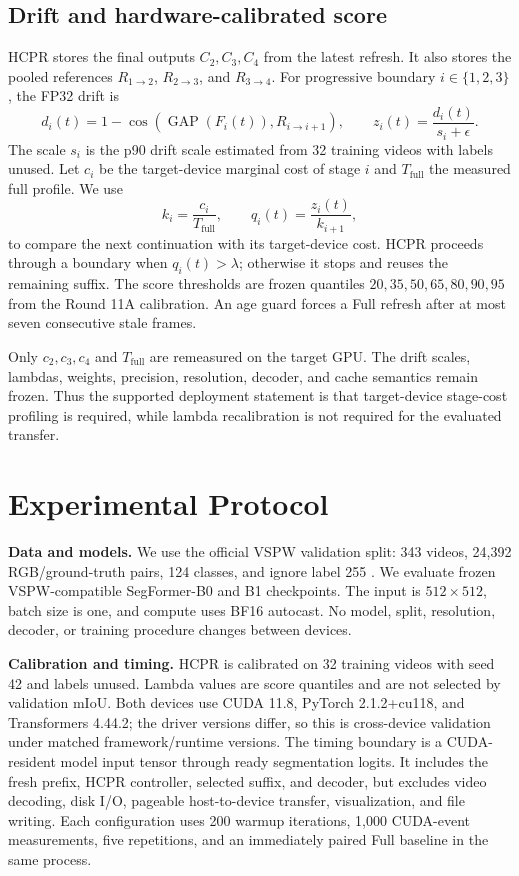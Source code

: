 \documentclass{article}
\begin{document}
\subsection{Drift and hardware-calibrated score}
HCPR stores the final outputs $C_2,C_3,C_4$ from the latest refresh. It also stores the pooled references $R_{1\to2}$, $R_{2\to3}$, and $R_{3\to4}$. For progressive boundary $i\in\{1,2,3\}$, the FP32 drift is
\begin{equation}
 d_i(t)=1-\cos\!\left(\operatorname{GAP}(F_i(t)),R_{i\to i+1}\right),\qquad z_i(t)=\frac{d_i(t)}{s_i+\epsilon}.
\end{equation}
The scale $s_i$ is the p90 drift scale estimated from 32 training videos with labels unused. Let $c_i$ be the target-device marginal cost of stage $i$ and $T_{\mathrm{full}}$ the measured full profile. We use
\begin{equation}
 k_i=\frac{c_i}{T_{\mathrm{full}}},\qquad q_i(t)=\frac{z_i(t)}{k_{i+1}},
\end{equation}
to compare the next continuation with its target-device cost. HCPR proceeds through a boundary when $q_i(t)>\lambda$; otherwise it stops and reuses the remaining suffix. The score thresholds are frozen quantiles $20,35,50,65,80,90,95$ from the Round 11A calibration. An age guard forces a Full refresh after at most seven consecutive stale frames.

Only $c_2,c_3,c_4$ and $T_{\mathrm{full}}$ are remeasured on the target GPU. The drift scales, lambdas, weights, precision, resolution, decoder, and cache semantics remain frozen. Thus the supported deployment statement is that target-device stage-cost profiling is required, while lambda recalibration is not required for the evaluated transfer.

\section{Experimental Protocol}
\textbf{Data and models.} We use the official VSPW validation split: 343 videos, 24,392 RGB/ground-truth pairs, 124 classes, and ignore label 255 \cite{miao2021vspw}. We evaluate frozen VSPW-compatible SegFormer-B0 and B1 checkpoints. The input is $512\times512$, batch size is one, and compute uses BF16 autocast. No model, split, resolution, decoder, or training procedure changes between devices.

\textbf{Calibration and timing.} HCPR is calibrated on 32 training videos with seed 42 and labels unused. Lambda values are score quantiles and are not selected by validation mIoU. Both devices use CUDA 11.8, PyTorch 2.1.2+cu118, and Transformers 4.44.2; the driver versions differ, so this is cross-device validation under matched framework/runtime versions. The timing boundary is a CUDA-resident model input tensor through ready segmentation logits. It includes the fresh prefix, HCPR controller, selected suffix, and decoder, but excludes video decoding, disk I/O, pageable host-to-device transfer, visualization, and file writing. Each configuration uses 200 warmup iterations, 1,000 CUDA-event measurements, five repetitions, and an immediately paired Full baseline in the same process.
\end{document}
